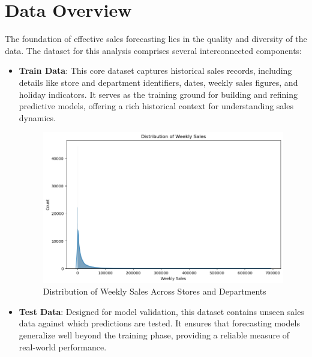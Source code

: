 \section{Data Overview}
The foundation of effective sales forecasting lies in the quality and diversity of the data. The dataset for this analysis comprises several interconnected components:
\begin{itemize}
    \item \textbf{Train Data}: This core dataset captures historical sales records, including details like store and department identifiers, dates, weekly sales figures, and holiday indicators. It serves as the training ground for building and refining predictive models, offering a rich historical context for understanding sales dynamics.
    \begin{figure}[h]
        \centering
        \includegraphics[width=0.8\linewidth]{latex/figures_adarsh/Distribution_Sales .png}
        \caption{Distribution of Weekly Sales Across Stores and Departments}
        \label{fig:weekly_sales_dist}
    \end{figure}
    
    \item \textbf{Test Data}: Designed for model validation, this dataset contains unseen sales data against which predictions are tested. It ensures that forecasting models generalize well beyond the training phase, providing a reliable measure of real-world performance.
    

\end{itemize}
